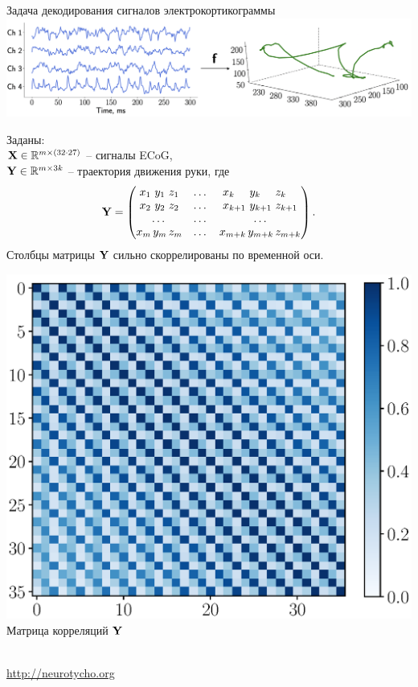 \documentclass[10pt]{beamer}
\begin{document}
\begin{frame}{Задача декодирования сигналов электрокортикограммы}
    \includegraphics[width=1.0\linewidth]{figs/slide3_1}
	\begin{minipage}{.58\linewidth}
 	Заданы: \\
	$\mathbf{X} \in \mathbb{R}^{m \times (32 \cdot 27)}$ -- сигналы ECoG, \\
	$\mathbf{Y} \in \mathbb{R}^{m \times 3k}$ -- траектория движения руки, где
	\vspace{0.1cm}
	\[
		\mathbf{Y} = 
		\begin{pmatrix}
		x_1 \,\, y_1 \,\, z_1 & \dots & x_{k\hphantom{+1}} \,\, y_{k\hphantom{+1}} \,\, z_{k\hphantom{+1}}\\
		x_2 \,\, y_2 \,\, z_2 & \dots & x_{k + 1} \,\, y_{k + 1} \,\, z_{k + 1}\\
		 \dots & \dots & \dots  \\
		x_m \, y_m \, z_m & \dots & x_{m + k} \, y_{m + k} \, z_{m + k}
		\end{pmatrix}.
	\]
	Столбцы матрицы $\mathbf{Y}$ сильно скоррелированы по временной оси.
	\end{minipage}%
	\begin{minipage}{.42\linewidth}
		\includegraphics[width=\linewidth]{figs/Y_corr_matrix.eps} \\
		\centering Матрица корреляций $\mathbf{Y}$
	\end{minipage}
	\\
	\url{http://neurotycho.org}
\end{frame}
\end{document}
